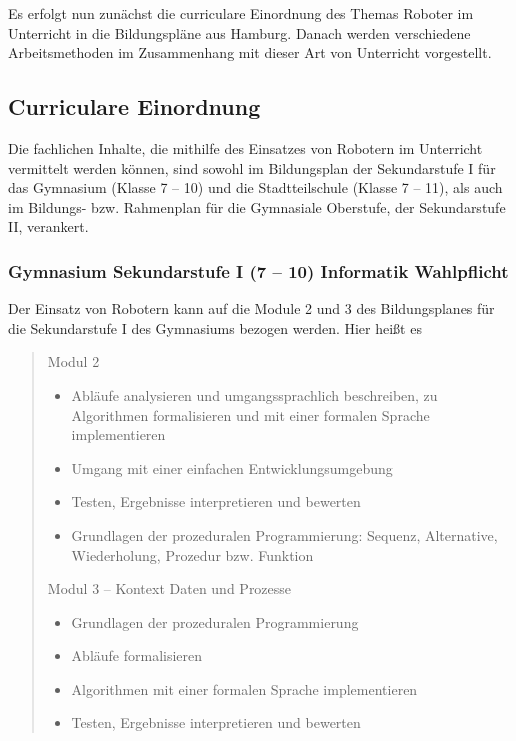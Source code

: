 \documentclass[paper=a4, pagesize, DIV=calc, BCOR=15mm, twoside=on, onecolumn=on, open = right, titlepage =on, parskip =half-, headsepline = on, footsepline = on, chapterprefix = on, appendixprefix = off, fontsize = 12pt, numbers = noenddot, abstract = on]{scrbook}
\numberwithin{equation}{chapter}
\theoremstyle{definition}
\theoremstyle{plain}
\theoremstyle{plain}
\theoremstyle{remark}
\theoremstyle{plain}
\theoremstyle{plain}
\begin{document}
Es erfolgt nun zunächst die curriculare Einordnung des Themas Roboter im Unterricht in die Bildungspläne aus Hamburg. Danach werden verschiedene Arbeitsmethoden im Zusammenhang mit dieser Art von Unterricht vorgestellt.

\subsection{Curriculare Einordnung}
Die fachlichen Inhalte, die mithilfe des Einsatzes von Robotern im Unterricht vermittelt werden können, sind sowohl im Bildungsplan der Sekundarstufe I für das Gymnasium (Klasse 7 -- 10) und die Stadtteilschule (Klasse 7 -- 11), als auch im Bildungs- bzw. Rahmenplan für die Gymnasiale Oberstufe, der Sekundarstufe II, verankert.

\subsubsection{Gymnasium Sekundarstufe I (7 -- 10) Informatik Wahlpflicht}
Der Einsatz von Robotern kann auf die Module 2 und 3 des Bildungsplanes für die Sekundarstufe I des Gymnasiums bezogen werden. Hier heißt es\\
 \begin{quote}
Modul 2
\begin{itemize}
\item Abläufe analysieren und umgangssprachlich beschreiben, zu Algorithmen formalisieren und mit einer formalen Sprache implementieren
\item Umgang mit einer einfachen Entwicklungsumgebung
\item Testen, Ergebnisse interpretieren und bewerten
\item Grundlagen der prozeduralen Programmierung: Sequenz, Alternative, Wiederholung, Prozedur bzw. Funktion
\end{itemize}
\vspace*{1cm}
Modul 3 -- Kontext Daten und Prozesse
\begin{itemize}
\item Grundlagen der prozeduralen Programmierung
\item Abläufe formalisieren
\item Algorithmen mit einer formalen Sprache implementieren
\item Testen, Ergebnisse interpretieren und bewerten \qquad \cite{gymsek1:11} 
\end{itemize}
 \end{quote}
\end{document}
